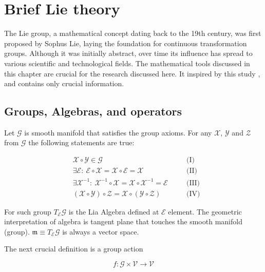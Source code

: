 \appendix
\chapter{Brief Lie theory}

The Lie group, a mathematical concept dating back to the 19th century, was 
first proposed by Sophus Lie, laying the foundation for continuous 
transformation groups. Although it was initially abstract, over time its 
influence has spread to various scientific and technological fields. The 
mathematical tools discussed in this chapter are crucial for the research 
discussed here. It inspired by this study \cite{MicroLieTheory}, and 
contains only crucial information.

\section{Groups, Algebras, and operators}
\label{sec:group_algebra_ops}

Let $\mathcal{G}$ is smooth manifold that satisfies the group axioms. For any 
$\mathcal{X}$, $\mathcal{Y}$ and $\mathcal{Z}$ from $\mathcal{G}$ the following 
statements are true:

\begin{equation}
    \begin{aligned}
        \label{eqn:g_axi}
        & \mathcal{X} \circ \mathcal{Y} \in \mathcal{G} \quad && \text{(I)} \\
        & \exists \mathcal{E}:\ \mathcal{E} \circ \mathcal{X} 
        = \mathcal{X} \circ \mathcal{E} = \mathcal{X} \quad && \text{(II)} \\
        & \exists \mathcal{X}^{-1}:\ \mathcal{X}^{-1} \circ \mathcal{X}
        = \mathcal{X} \circ \mathcal{X}^{-1} = \mathcal{E} \quad && \text{(III)} \\ 
        & (\mathcal{X} \circ \mathcal{Y}) \circ \mathcal{Z} = 
        \mathcal{X} \circ (\mathcal{Y} \circ \mathcal{Z}) \quad && \text{(IV)}
    \end{aligned}
\end{equation}

For such group $T_{\mathcal{E}} \mathcal{G}$ is the Lia Algebra defined at 
$\mathcal{E}$ element. The geometric interpretation of algebra is tangent plane 
that touches the smooth manifold (group). $\mathfrak{m} \equiv 
T_{\mathcal{E}} \mathcal{G}$ is always a vector space.

The next crucial definition is a group action

\begin{equation}
    f: \mathcal{G} \times \mathcal{V} \to \mathcal{V}
\end{equation}

